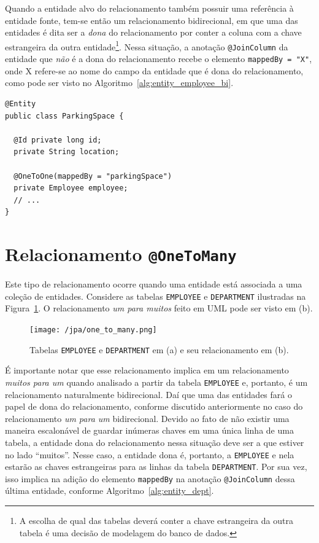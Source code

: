 \documentclass[
  10.5pt,				  %
	openright,			%
	twoside,			  %
  a5paper,
  chapter=TITLE,	%
	section=TITLE,	%
  hyphens,        %
	english,        %
	brazil          %
]{abntex2}
\begin{document}
Quando a entidade alvo do relacionamento também possuir uma referência à entidade fonte, tem-se então um relacionamento bidirecional, em que uma das entidades é dita ser a \emph{dona} do relacionamento por conter a coluna com a chave estrangeira da outra entidade\footnote{A escolha de qual das tabelas deverá conter a chave estrangeira da outra tabela é uma decisão de modelagem do banco de dados.}. Nessa situação, a anotação \texttt{@JoinColumn} da entidade que \emph{não} é a dona do relacionamento recebe o elemento \texttt{mappedBy = "X"}, onde X refere-se ao nome do campo da entidade que é dona do relacionamento, como pode ser visto no Algoritmo~\ref{alg:entity_employee_bi}.

\begin{lstlisting}[caption={Classe ParkingSpace e seus relacionamentos.}, label={alg:entity_employee_bi}]
@Entity
public class ParkingSpace {
  
  @Id private long id;
  private String location;

  @OneToOne(mappedBy = "parkingSpace")
  private Employee employee;
  // ...
}
\end{lstlisting}
%

\section{Relacionamento \texttt{@OneToMany}}

Este tipo de relacionamento ocorre quando uma entidade está associada a uma coleção de entidades. Considere as tabelas \texttt{EMPLOYEE} e \texttt{DEPARTMENT} ilustradas na Figura~\ref{fig:jpa_onetomany}. O relacionamento \emph{um para muitos} feito em UML pode ser visto em (b).

\begin{figure}[!ht]
  \caption{\label{fig:jpa_onetomany} Tabelas \texttt{EMPLOYEE} e \texttt{DEPARTMENT} em (a) e seu relacionamento em (b).}
  \begin{center}
    \texttt{[image: /jpa/one\_to\_many.png]}
  \end{center}
\end{figure}


É importante notar que esse relacionamento implica em um relacionamento \emph{muitos para um} quando analisado a partir da tabela \texttt{EMPLOYEE} e, portanto, é um relacionamento naturalmente bidirecional. Daí que uma das entidades fará o papel de dona do relacionamento, conforme discutido anteriormente no caso do relacionamento \emph{um para um} bidirecional. Devido ao fato de não existir uma maneira escalonável de guardar inúmeras chaves em uma única linha de uma tabela, a entidade dona do relacionamento nessa situação deve ser a que estiver no lado ``muitos''. Nesse caso, a entidade dona é, portanto, a \texttt{EMPLOYEE} e nela estarão as chaves estrangeiras para as linhas da tabela \texttt{DEPARTMENT}. Por sua vez, isso implica na adição do elemento \texttt{mappedBy} na anotação \texttt{@JoinColumn} dessa última entidade, conforme Algoritmo~\ref{alg:entity_dept}.
\end{document}
